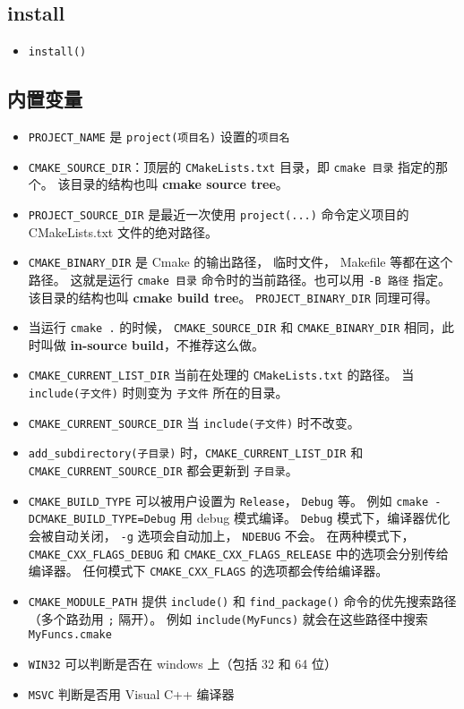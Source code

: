 \subsection{install}
\begin{itemize}
\item \verb`install()`
\end{itemize}


\subsection{内置变量}
\begin{itemize}
\item \verb`PROJECT_NAME` 是 \verb`project(项目名)` 设置的\verb`项目名`
\item \verb`CMAKE_SOURCE_DIR`：顶层的 \verb`CMakeLists.txt` 目录，即 \verb`cmake 目录` 指定的那个。 该目录的结构也叫 \textbf{cmake source tree}。
\item \verb`PROJECT_SOURCE_DIR` 是最近一次使用 \verb`project(...)` 命令定义项目的 CMakeLists.txt 文件的绝对路径。
\item \verb`CMAKE_BINARY_DIR` 是 Cmake 的输出路径， 临时文件， Makefile 等都在这个路径。 这就是运行 \verb`cmake 目录` 命令时的当前路径。也可以用 \verb`-B 路径` 指定。 该目录的结构也叫 \textbf{cmake build tree}。 \verb`PROJECT_BINARY_DIR` 同理可得。
\item 当运行 \verb`cmake .` 的时候， \verb`CMAKE_SOURCE_DIR` 和 \verb`CMAKE_BINARY_DIR` 相同，此时叫做 \textbf{in-source build}，不推荐这么做。
\item \verb`CMAKE_CURRENT_LIST_DIR` 当前在处理的 \verb`CMakeLists.txt` 的路径。 当 \verb`include(子文件)` 时则变为 \verb`子文件` 所在的目录。
\item \verb`CMAKE_CURRENT_SOURCE_DIR` 当 \verb`include(子文件)` 时不改变。
\item \verb`add_subdirectory(子目录)` 时，\verb`CMAKE_CURRENT_LIST_DIR` 和 \verb`CMAKE_CURRENT_SOURCE_DIR` 都会更新到 \verb`子目录`。
\item \verb`CMAKE_BUILD_TYPE` 可以被用户设置为 \verb`Release`， \verb`Debug` 等。 例如 \verb`cmake -DCMAKE_BUILD_TYPE=Debug` 用 debug 模式编译。 \verb`Debug` 模式下，编译器优化会被自动关闭， \verb`-g` 选项会自动加上， \verb`NDEBUG` 不会。 在两种模式下， \verb`CMAKE_CXX_FLAGS_DEBUG` 和 \verb`CMAKE_CXX_FLAGS_RELEASE` 中的选项会分别传给编译器。 任何模式下 \verb`CMAKE_CXX_FLAGS` 的选项都会传给编译器。
\item \verb`CMAKE_MODULE_PATH` 提供 \verb`include()` 和 \verb`find_package()` 命令的优先搜索路径（多个路劲用 \verb`;` 隔开）。 例如 \verb`include(MyFuncs)` 就会在这些路径中搜索 \verb`MyFuncs.cmake`
\item \verb`WIN32` 可以判断是否在 windows 上（包括 32 和 64 位）
\item \verb`MSVC` 判断是否用 Visual C++ 编译器
\end{itemize}

